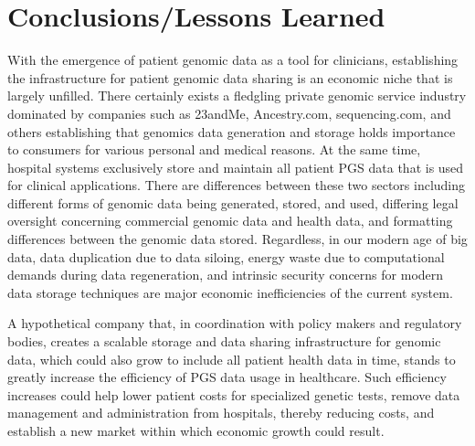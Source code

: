 \documentclass[runningheads]{llncs}
\begin{document}
\section{Conclusions/Lessons Learned}

With the emergence of patient genomic data as a tool for clinicians, establishing the infrastructure for patient genomic data sharing is an economic niche that is largely unfilled. 
There certainly exists a fledgling private genomic service industry dominated by companies such as 23andMe, Ancestry.com, sequencing.com, and others establishing that genomics data generation and storage holds importance to consumers for various personal and medical reasons. 
At the same time, hospital systems exclusively store and maintain all patient PGS data that is used for clinical applications. 
There are differences between these two sectors including different forms of genomic data being generated, stored, and used, differing legal oversight concerning commercial genomic data and health data, and formatting differences between the genomic data stored. 
Regardless, in our modern age of big data, data duplication due to data siloing, energy waste due to computational demands during data regeneration, and intrinsic security concerns for modern data storage techniques are major economic inefficiencies of the current system. 

A hypothetical company that, in coordination with policy makers and regulatory bodies, creates a scalable storage and data sharing infrastructure for genomic data, which could also grow to include all patient health data in time, stands to greatly increase the efficiency of PGS data usage in healthcare. 
Such efficiency increases could help lower patient costs for specialized genetic tests, remove data management and administration from hospitals, thereby reducing costs, and establish a new market within which economic growth could result. 
\end{document}
